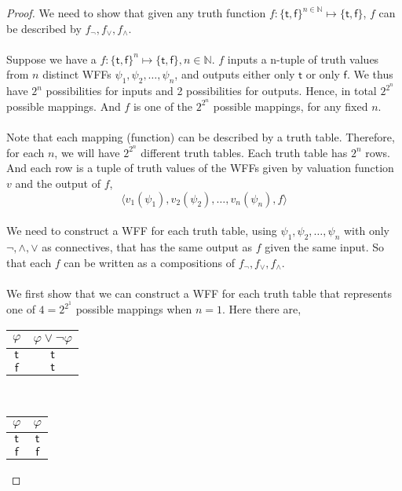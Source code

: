 \documentclass[12pt]{article}
\begin{document}
\begin{proof}
    We need to show that given any truth function $f \colon \{\mathsf{t}, \mathsf{f}\}^{n \in \mathbb{N}} \longmapsto \{\mathsf{t}, \mathsf{f}\}$, $f$ can be described by $f_{\neg},f_{\lor}, f_{\land}$.\\
    \\
    Suppose we have a $f \colon \{\mathsf{t}, \mathsf{f}\}^n \longmapsto \{\mathsf{t}, \mathsf{f}\}, n \in \mathbb{N}$.
    $f$ inputs a n-tuple of truth values from $n$ distinct WFFs $\psi_1, \psi_2, \dots, \psi_n$, and outputs either only $\mathsf{t}$ or only $\mathsf{f}$.
    We thus have $2^n$ possibilities for inputs and 2 possibilities for outputs. 
    Hence, in total $2^{2^n}$ possible mappings.
    And $f$ is one of the $2^{2^n}$ possible mappings, for any fixed $n$.\\
    \\
    Note that each mapping (function) can be described by a truth table.
    Therefore, for each $n$, we will have $2^{2^n}$ different truth tables.
    Each truth table has $2^n$ rows.
    And each row is a tuple of truth values of the WFFs given by valuation function $v$ and the output of $f$,
    $$\langle v_1(\psi_1), v_2(\psi_2), \dots, v_n(\psi_n), f \rangle$$
    \\
    We need to construct a WFF for each truth table, using $\psi_1, \psi_2, \dots, \psi_n$ with only $\neg, \land, \lor$ as connectives, that has the same output as $f$ given the same input.
    So that each $f$ can be written as a compositions of $f_{\neg}, f_{\lor}, f_{\land}$.\\
    \\
    We first show that we can construct a WFF for each truth table that represents one of $4 = 2^{2^1}$ possible mappings when $n = 1$.
    Here there are,
    \begin{center}
        \begin{tabular}{c|c}
            $\varphi$ & $\varphi \lor \neg \varphi$\\ \hline
            $\mathsf{t}$ & $\mathsf{t}$\\
            $\mathsf{f}$ & $\mathsf{t}$\\
        \end{tabular}
        ~~~
        \begin{tabular}{c|c}
            $\varphi$ & $\varphi$ \\ \hline
            $\mathsf{t}$ & $\mathsf{t}$\\
            $\mathsf{f}$ & $\mathsf{f}$\\

\end{tabular}
\end{center}
\end{proof}
\end{document}
